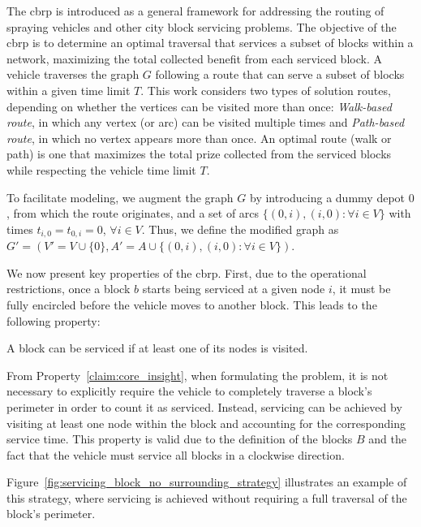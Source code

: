 The \gls{cbrp} is introduced as a general framework for addressing the routing
of spraying vehicles and other city block servicing problems. The objective of
the \gls{cbrp} is to determine an optimal traversal that services a subset of
blocks within a network, maximizing the total collected benefit from each
serviced block. A vehicle traverses the graph $G$ following a route that can
serve a subset of blocks within a given time limit $T$. This work considers two
types of solution routes, depending on whether the vertices can be visited more
than once: \textit{Walk-based route}, in which any vertex (or arc) can be
visited multiple times and \textit{Path-based route}, in which no vertex appears
more than once. An optimal route (walk or path) is one that maximizes the total
prize collected from the serviced blocks while respecting the vehicle time limit
$T$.

To facilitate modeling, we augment the graph $G$ by introducing a dummy depot
$0$, from which the route originates, and a set of arcs $\{(0, i), (i, 0) :
	\forall i \in V\}$ with times $t_{i,0} = t_{0,i} = 0$, $\forall i \in V$. Thus,
we define the modified graph as $G' = (V' = V \cup \{0\}, A' = A \cup \{(0, i),
	(i, 0) : \forall i \in V\})$.

We now present key properties of the \gls{cbrp}. First, due to the operational
restrictions, once a block $b$ starts being serviced at a given node $i$, it
must be fully encircled before the vehicle moves to another block. This leads to
the following property:

\begin{property}
	\label{claim:core_insight}
	A block can be serviced if at least one of its nodes is visited.
\end{property}

From Property~\ref{claim:core_insight}, when formulating the problem, it is not
necessary to explicitly require the vehicle to completely traverse a block's
perimeter in order to count it as serviced. Instead, servicing can be achieved
by visiting at least one node within the block and accounting for the
corresponding service time. This property is valid due to the definition of the
blocks $B$ and the fact that the vehicle must service all blocks in a clockwise
direction.

Figure~\ref{fig:servicing_block_no_surrounding_strategy} illustrates an example
of this strategy, where servicing is achieved without requiring a full traversal
of the block's perimeter.

